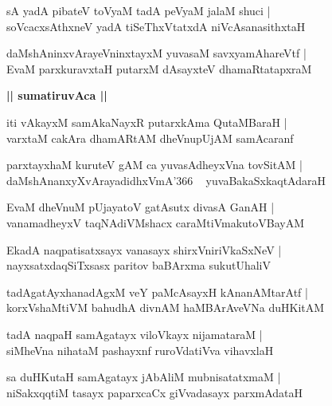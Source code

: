 \documentclass[twoside,12pt,openright]{book}
\newcounter{shloka}[chapter]
\def\uvaca#1{\centerline{{\large\textbf{#1}}}}
\begin{document}
\begin{shloka}%
sA yadA pibateV toVyaM tadA peVyaM jalaM shuci |\\
soVcacxsAthxneV yadA tiSeThxVtatxdA niVcAsanasithxtaH 
\end{shloka}

\begin{shloka}%
daMshAninxvArayeVninxtayxM yuvasaM savxyamAhareVtf |\\
EvaM parxkuravxtaH putarxM dAsayxteV dhamaRtatapxraM 
\end{shloka}

\uvaca{|| sumatiruvAca ||}

\begin{shloka}%
iti vAkayxM samAkaNayxR putarxkAma QutaMBaraH |\\
varxtaM cakAra dhamARtAM dheVnupUjAM samAcaranf 
\end{shloka}

\begin{shloka}%
parxtayxhaM kuruteV gAM  ca  yuvasAdheyxVna tovSitAM |\\
daMshAnanxyXvArayadidhxVmA\char'366 ~ yuvaBakaSxkaqtAdaraH 
\end{shloka}

\begin{shloka}%
EvaM dheVnuM pUjayatoV gatAsutx divasA GanAH |\\
vanamadheyxV taqNAdiVMshacx caraMtiVmakutoVBayAM 
\end{shloka}

\begin{shloka}%
EkadA naqpatisatxsayx vanasayx shirxVniriVkaSxNeV |\\
nayxsatxdaqSiTxsasx paritov baBArxma sukutUhaliV 
\end{shloka}

\begin{shloka}%
tadAgatAyxhanadAgxM veY paMcAsayxH kAnanAMtarAtf |\\
korxVshaMtiVM bahudhA divnAM haMBArAveVNa duHKitAM 
\end{shloka}

\begin{shloka}%
tadA naqpaH samAgatayx viloVkayx nijamataraM |\\
siMheVna nihataM pashayxnf ruroVdatiVva vihavxlaH 
\end{shloka}

\begin{shloka}%
sa duHKutaH samAgatayx jAbAliM mubnisatatxmaM |\\
niSakxqqtiM tasayx paparxcaCx giVvadasayx parxmAdataH 
\end{shloka}
\end{document}

